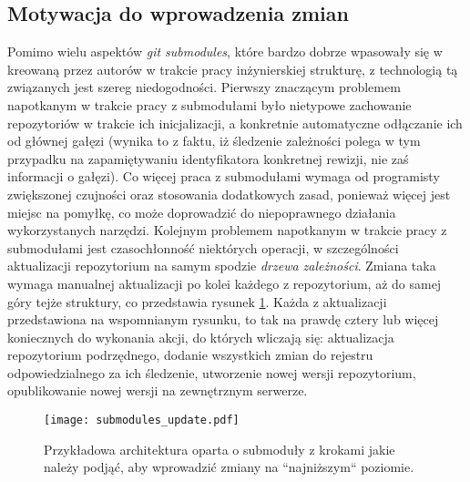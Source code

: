 \subsection{Motywacja do wprowadzenia zmian}
Pomimo wielu aspektów \emph{git submodules}, które bardzo dobrze wpasowały się w kreowaną przez autorów w trakcie pracy inżynierskiej strukturę, z technologią tą związanych jest szereg niedogodności. Pierwszy znaczącym problemem napotkanym w trakcie pracy z submodułami było nietypowe zachowanie repozytoriów w trakcie ich inicjalizacji, a konkretnie automatyczne odłączanie ich od głównej gałęzi (wynika to z faktu, iż śledzenie zależności polega w tym przypadku na zapamiętywaniu identyfikatora konkretnej rewizji, nie zaś informacji o gałęzi). Co więcej praca z submodułami wymaga od programisty zwiększonej czujności oraz stosowania dodatkowych zasad, ponieważ więcej jest miejsc na pomyłkę, co może doprowadzić do niepoprawnego działania wykorzystanych narzędzi. Kolejnym problemem napotkanym w trakcie pracy z submodułami jest czasochłonność niektórych operacji, w szczególności aktualizacji repozytorium na samym spodzie \emph{drzewa zależności}. Zmiana taka wymaga manualnej aktualizacji po kolei każdego z repozytorium, aż do samej góry tejże struktury, co przedstawia rysunek \ref {fig:submodules_update}. Każda z aktualizacji przedstawiona na wspomnianym rysunku, to tak na prawdę cztery lub więcej koniecznych do wykonania akcji, do których wliczają się: aktualizacja repozytorium podrzędnego, dodanie wszystkich zmian do rejestru odpowiedzialnego za ich śledzenie, utworzenie nowej wersji repozytorium, opublikowanie nowej wersji na zewnętrznym serwerze.

\begin{figure}[H]
    \centering
    \texttt{[image: submodules\_update.pdf]}
    \caption{Przykładowa architektura oparta o submoduły z krokami jakie należy podjąć, aby wprowadzić zmiany na ``najniższym`` poziomie.}
    \label{fig:submodules_update}
\end{figure}


